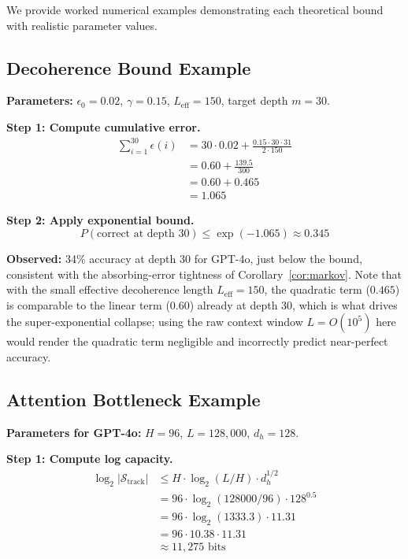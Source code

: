 \documentclass{article}
\theoremstyle{plain}
\theoremstyle{definition}
\theoremstyle{remark}
\newcommand{\Leff}{L_{\mathrm{eff}}}
\begin{document}
We provide worked numerical examples demonstrating each theoretical bound with realistic parameter values.

\subsection{Decoherence Bound Example}

\textbf{Parameters:} $\epsilon_0 = 0.02$, $\gamma = 0.15$, $\Leff = 150$, target depth $m = 30$.

\textbf{Step 1: Compute cumulative error.}
\begin{align}
\sum_{i=1}^{30} \epsilon(i) &= 30 \cdot 0.02 + \frac{0.15 \cdot 30 \cdot 31}{2 \cdot 150} \\
&= 0.60 + \frac{139.5}{300} \\
&= 0.60 + 0.465 \\
&= 1.065
\end{align}

\textbf{Step 2: Apply exponential bound.}
\begin{equation}
P(\text{correct at depth } 30) \leq \exp(-1.065) \approx 0.345
\end{equation}

\textbf{Observed:} 34\% accuracy at depth 30 for GPT-4o, just below the bound, consistent with the absorbing-error tightness of Corollary~\ref{cor:markov}. Note that with the small effective decoherence length $\Leff = 150$, the quadratic term ($0.465$) is comparable to the linear term ($0.60$) already at depth 30, which is what drives the super-exponential collapse; using the raw context window $L = O(10^5)$ here would render the quadratic term negligible and incorrectly predict near-perfect accuracy.

\subsection{Attention Bottleneck Example}

\textbf{Parameters for GPT-4o:} $H = 96$, $L = 128,000$, $d_h = 128$.

\textbf{Step 1: Compute log capacity.}
\begin{align}
\log_2 |\mathcal{S}_\text{track}| &\leq H \cdot \log_2(L/H) \cdot d_h^{1/2} \\
&= 96 \cdot \log_2(128000/96) \cdot 128^{0.5} \\
&= 96 \cdot \log_2(1333.3) \cdot 11.31 \\
&= 96 \cdot 10.38 \cdot 11.31 \\
&\approx 11,275 \text{ bits}
\end{align}
\end{document}
